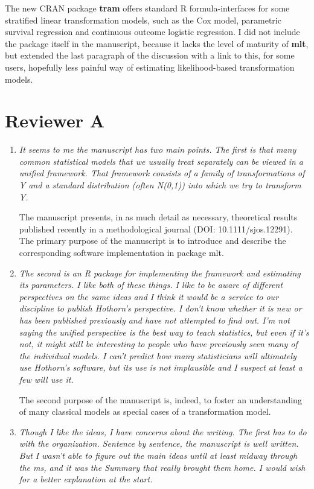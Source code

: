 \documentclass[12pt]{article}
\begin{document}
The new CRAN package \textbf{tram} offers standard R formula-interfaces for
some stratified linear transformation models, such as the Cox model,
parametric survival regression and continuous outcome logistic regression. I
did not include the package itself in the manuscript, because it lacks the
level of maturity of \textbf{mlt}, but extended the last paragraph of the
discussion with a link to this, for some users, hopefully less painful way
of estimating likelihood-based transformation models.

\section*{Reviewer A}

\begin{enumerate}

\item \textit{It seems to me the manuscript has two main points.  The first
is that many common statistical models that we usually treat separately can
be viewed in a unified framework.  That framework consists of a family of
transformations of Y and a standard distribution (often N(0,1)) into which
we try to transform Y.}

The manuscript presents, in as much detail as necessary, theoretical results
published recently in a methodological journal (DOI: 10.1111/sjos.12291).
The primary purpose of the manuscript is to introduce and describe the
corresponding software implementation in package mlt.

\item \textit{ The second is an R package for implementing the
framework and estimating its parameters.  I like both of these things.  I
like to be aware of different perspectives on the same ideas and I think it
would be a service to our discipline to publish Hothorn’s perspective.  I
don’t know whether it is new or has been published previously and have not
attempted to find out.  I’m not saying the unified perspective is the best
way to teach statistics, but even if it’s not, it might still be interesting
to people who have previously seen many of the individual models.  I can’t
predict how many statisticians will ultimately use Hothorn’s software, but
its use is not implausible and I suspect at least a few will use it.}

The second purpose of the manuscript is, indeed, to foster an understanding
of many classical models as special cases of a transformation model.

\item \textit{Though I like the ideas, I have concerns about the writing. 
The first has to do with the organization.  Sentence by sentence, the
manuscript is well written.  But I wasn’t able to figure out the main ideas
until at least midway through the ms, and it was the Summary that really
brought them home. I would wish for a better explanation at the start.}


\end{enumerate}
\end{document}
